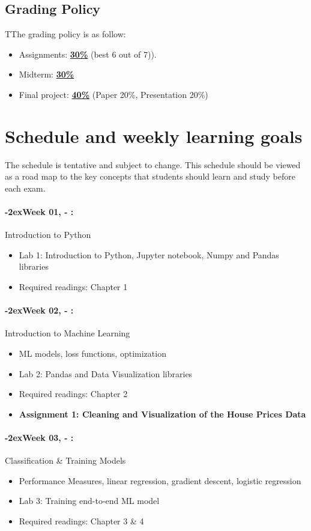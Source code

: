 \documentclass[11pt]{article}
\newcommand{\week}[1]{%
  \paragraph*{\kern-2ex\quad #1, \syldate{\today} - \AdvanceDate[4]\syldate{\today}:}%
  \ifdim\wd1=\wd\MONDAY
    \AdvanceDate[7]
  \else
    \AdvanceDate[7]
  \fi%
}
\begin{document}
\subsection*{Grading Policy}
TThe grading policy is as follow:
\begin{itemize}
	\item Assignments: \underline{\textbf{30\%}} (best 6 out of 7)).
	\item Midterm: \underline{\textbf{30\%}}
	\item Final project: \underline{\textbf{40\%}} (Paper 20\%, Presentation 20\%)
\end{itemize}






\newpage
\section*{Schedule and weekly learning goals}

The schedule is tentative and subject to change. This schedule should be viewed as a road map to the key concepts that students should learn and study before each exam.

\SetDate[17/01/2022]
\week{Week 01} Introduction to Python 
\begin{itemize}
\item Lab 1: Introduction to Python, Jupyter notebook, Numpy and Pandas libraries
\item Required readings: Chapter 1
\end{itemize}

\week{Week 02} Introduction to Machine Learning
\begin{itemize}
\item ML models, loss functions, optimization
\item Lab 2: Pandas and Data Visualization libraries 
\item Required readings: Chapter 2 
\item \textbf{Assignment 1: Cleaning and Visualization of the House Prices Data}
\end{itemize}

\week{Week 03} Classification & Training Models
\begin{itemize}
\item Performance Measures, linear regression, gradient descent, logistic regression
\item Lab 3: Training end-to-end ML model
\item Required readings: Chapter 3 {\&} 4
\end{itemize}
\end{document}
